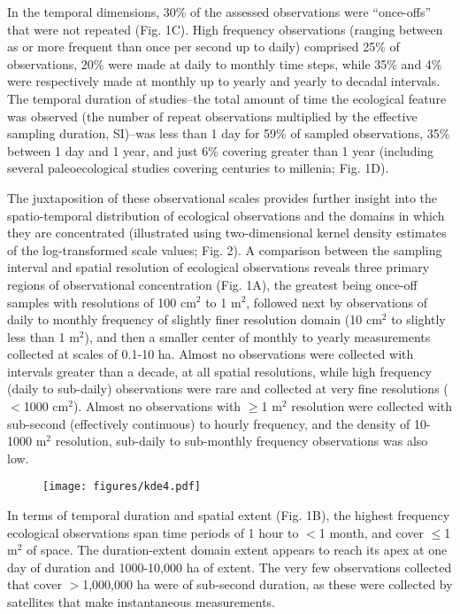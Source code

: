\documentclass[12pt]{article}
\begin{document}
In the temporal dimensions, 30\% of the assessed observations were ``once-offs'' that were not repeated (Fig. 1C). High frequency observations (ranging between as or more frequent than once per second up to daily) comprised 25\% of observations, 20\% were made at daily to monthly time steps, while 35\% and 4\% were respectively made at monthly up to yearly and yearly to decadal intervals.  The temporal duration of studies--the total amount of time the ecological feature was observed (the number of repeat observations multiplied by the effective sampling duration, SI)--was less than 1 day for 59\% of sampled observations,  35\% between 1 day and 1 year, and just 6\% covering greater than 1 year (including several paleoecological studies covering centuries to millenia; Fig. 1D).

The juxtaposition of these observational scales provides further insight into the spatio-temporal distribution of ecological observations and the domains in which they are concentrated (illustrated using two-dimensional kernel density estimates of the log-transformed scale values; Fig. 2). A comparison between the sampling interval and spatial resolution of ecological observations reveals three primary regions of observational concentration (Fig. 1A), the greatest being once-off samples with resolutions of 100 cm$^2$ to 1 m$^2$, followed next by observations of daily to monthly frequency of slightly finer resolution domain (10 cm$^2$ to slightly less than 1 m$^2$), and then a smaller center of monthly to yearly measurements collected at scales of 0.1-10 ha.  Almost no observations were collected with intervals greater than a decade, at all spatial resolutions, while high frequency (daily to sub-daily) observations were rare and collected at very fine resolutions ($<$1000 cm$^2$). Almost no observations with $\geq$1 m$^2$ resolution were collected with sub-second (effectively continuous) to hourly frequency, and the density of 10-1000 m$^2$ resolution, sub-daily to sub-monthly frequency observations was also low. 

\begin{figure}[h]
\texttt{[image: figures/kde4.pdf]}
\vspace{-0.15 cm}
\caption{}
\label{afoto1}
\end{figure}

In terms of temporal duration and spatial extent (Fig. 1B), the highest frequency ecological observations span time periods of 1 hour to $<$1 month, and cover $\leq$1 m$^2$ of space. The duration-extent domain extent appears to reach its apex at one day of duration and 1000-10,000 ha of extent. The very few observations collected that cover $>$1,000,000 ha were of sub-second duration, as these were collected by satellites that make instantaneous measurements.  
\end{document}
